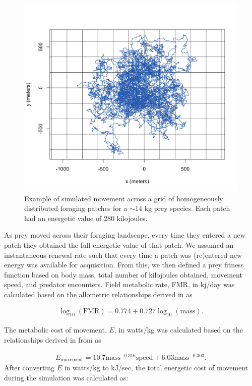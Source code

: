 \documentclass[12pt]{article}
\begin{document}
\begin{figure}[!h]
\centering
\includegraphics[scale=1]{Prey_Movement.png}
\caption{Example of simulated movement across a grid of homogeneously distributed foraging patches for a $\sim$14 kg prey species. Each patch had an energetic value of 280 kilojoules.}
\label{fig:Prey_Example}
\end{figure}

As prey moved across their foraging landscape, every time they entered a new patch they obtained the full energetic value of that patch. We assumed an instantaneous renewal rate such that every time a patch was (re)entered new energy was available for acquisition. From this, we then defined a prey fitness function based on body mass, total number of kilojoules obtained, movement speed, and predator encounters. Field metabolic rate, FMR, in kj/day was calculated based on the allometric relationships derived in \cite{Nagy:1987} as 

\begin{gather}
\log_{10}(\mathrm{FMR}) = 0.774 + 0.727 \log_{10}(\mathrm{mass}).
\end{gather}

The metabolic cost of movement, $E$, in watts/kg was calculated based on the relationships derived in from \cite{Taylor:1982} as

\begin{gather}
E_{\mathrm{movement}} = 10.7 \mathrm{mass}^{-0.316} \mathrm{speed} + 6.03 \mathrm{mass}^{-0.303}.
\end{gather}
After converting $E$ in watts/kg to kJ/sec, the total energetic cost of movement during the simulation was calculated as:
\end{document}
